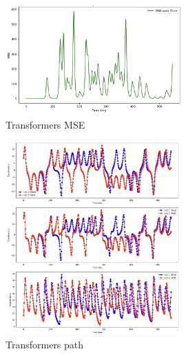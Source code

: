 \documentclass[11pt]{article}
\begin{document}
\begin{figure}[h]
\centering
\includegraphics[width=0.6\textwidth]{transformers_mse.jpeg}
\caption{Transformers MSE}
\end{figure}

\begin{figure}[h]
\centering
\includegraphics[width=0.6\textwidth]{transformers_path.jpeg}
\caption{Transformers path}
\end{figure}



\end{document}
